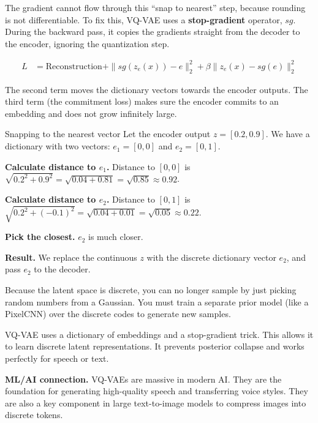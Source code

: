 \documentclass[a4paper,11pt]{article}
\newcommand{\vocab}[1]{\textbf{\color{navy}#1}}
\begin{document}
The gradient cannot flow through this ``snap to nearest'' step, because rounding is not differentiable. To fix this, VQ-VAE uses a \vocab{stop-gradient} operator, $sg$. During the backward pass, it copies the gradients straight from the decoder to the encoder, ignoring the quantization step.

\begin{align}
  L &= \text{Reconstruction} + \| sg(z_e(x)) - e \|_2^2 + \beta \| z_e(x) - sg(e) \|_2^2
\end{align}

The second term moves the dictionary vectors towards the encoder outputs. The third term (the commitment loss) makes sure the encoder commits to an embedding and does not grow infinitely large.

\begin{worked}{Snapping to the nearest vector}
Let the encoder output $z = [0.2, 0.9]$. We have a dictionary with two vectors: $e_1 = [0, 0]$ and $e_2 = [0, 1]$.
\begin{steps}
  \item \textbf{Calculate distance to $e_1$.} Distance to $[0, 0]$ is $\sqrt{0.2^2 + 0.9^2} = \sqrt{0.04 + 0.81} = \sqrt{0.85} \approx 0.92$.
  \item \textbf{Calculate distance to $e_2$.} Distance to $[0, 1]$ is $\sqrt{0.2^2 + (-0.1)^2} = \sqrt{0.04 + 0.01} = \sqrt{0.05} \approx 0.22$.
  \item \textbf{Pick the closest.} $e_2$ is much closer.
  \item \textbf{Result.} We replace the continuous $z$ with the discrete dictionary vector $e_2$, and pass $e_2$ to the decoder.
\end{steps}
\end{worked}

\begin{watchout}
Because the latent space is discrete, you can no longer sample by just picking random numbers from a Gaussian. You must train a separate prior model (like a PixelCNN) over the discrete codes to generate new samples.
\end{watchout}

\begin{keytake}
VQ-VAE uses a dictionary of embeddings and a stop-gradient trick. This allows it to learn discrete latent representations. It prevents posterior collapse and works perfectly for speech or text.
\end{keytake}

\noindent\textbf{ML/AI connection.}
VQ-VAEs are massive in modern AI. They are the foundation for generating high-quality speech and transferring voice styles. They are also a key component in large text-to-image models to compress images into discrete tokens.
\end{document}
